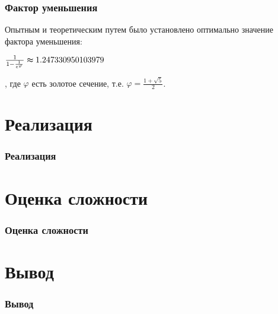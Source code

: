 \documentclass{beamer}
\begin{document}
\begin{frame}
    \frametitle{Фактор уменьшения}
    Опытным и теоретическим путем было установлено оптимально значение \alert{фактора уменьшения}:
    \begin{center}
        \Large $\frac{1}{1 - \frac1{e^{\varphi}}} \thickapprox 1.247330950103979$
    \end{center}
    , где $\varphi$ есть золотое сечение, т.е. $\varphi = \frac{1 + \sqrt{5}}2$.
\end{frame}

\section{Реализация}
\begin{frame}
    \frametitle{Реализация}
    
\end{frame}

\section{Оценка сложности}
\begin{frame}
    \frametitle{Оценка сложности}
\end{frame}

\section{Вывод}
\begin{frame}
    \frametitle{Вывод}
\end{frame}
\end{document}
